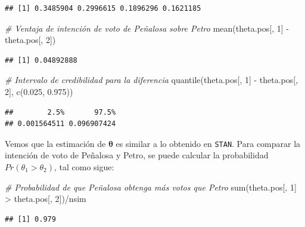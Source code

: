 \documentclass[
  10pt,
  spanish,
]{book}
\newenvironment{Shaded}{\begin{snugshade}}{\end{snugshade}}
\newcommand{\CommentTok}[1]{\textcolor[rgb]{0.56,0.35,0.01}{\textit{#1}}}
\newcommand{\DecValTok}[1]{\textcolor[rgb]{0.00,0.00,0.81}{#1}}
\newcommand{\FloatTok}[1]{\textcolor[rgb]{0.00,0.00,0.81}{#1}}
\newcommand{\FunctionTok}[1]{\textcolor[rgb]{0.00,0.00,0.00}{#1}}
\newcommand{\NormalTok}[1]{#1}
\newcommand{\SpecialCharTok}[1]{\textcolor[rgb]{0.00,0.00,0.00}{#1}}
\theoremstyle{definition}
\theoremstyle{definition}
\theoremstyle{definition}
\theoremstyle{definition}
\theoremstyle{remark}
\begin{document}
\begin{verbatim}
## [1] 0.3485904 0.2996615 0.1896296 0.1621185
\end{verbatim}

\begin{Shaded}
\begin{Highlighting}[]
\CommentTok{\# Ventaja de intención de voto de Peñalosa sobre Petro}
\FunctionTok{mean}\NormalTok{(theta.pos[, }\DecValTok{1}\NormalTok{] }\SpecialCharTok{{-}}\NormalTok{ theta.pos[, }\DecValTok{2}\NormalTok{])}
\end{Highlighting}
\end{Shaded}

\begin{verbatim}
## [1] 0.04892888
\end{verbatim}

\begin{Shaded}
\begin{Highlighting}[]
\CommentTok{\# Intervalo de credibilidad para la diferencia}
\FunctionTok{quantile}\NormalTok{(theta.pos[, }\DecValTok{1}\NormalTok{] }\SpecialCharTok{{-}}\NormalTok{ theta.pos[, }\DecValTok{2}\NormalTok{], }
         \FunctionTok{c}\NormalTok{(}\FloatTok{0.025}\NormalTok{, }\FloatTok{0.975}\NormalTok{))}
\end{Highlighting}
\end{Shaded}

\begin{verbatim}
##        2.5%       97.5% 
## 0.001564511 0.096907424
\end{verbatim}

Vemos que la estimación de \(\boldsymbol \theta\) es similar a lo obtenido en \texttt{STAN}. Para comparar la intención de voto de Peñalosa y Petro, se puede calcular la probabilidad \(Pr(\theta_1 > \theta_2)\), tal como sigue:

\begin{Shaded}
\begin{Highlighting}[]
\CommentTok{\# Probabilidad de que Peñalosa obtenga más votos que Petro}
\FunctionTok{sum}\NormalTok{(theta.pos[, }\DecValTok{1}\NormalTok{] }\SpecialCharTok{\textgreater{}}\NormalTok{ theta.pos[, }\DecValTok{2}\NormalTok{])}\SpecialCharTok{/}\NormalTok{nsim}
\end{Highlighting}
\end{Shaded}

\begin{verbatim}
## [1] 0.979
\end{verbatim}
\end{document}
